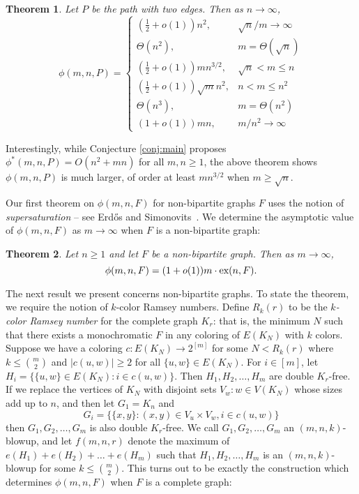 \documentclass[12pt]{article}
\newtheorem{theorem}{Theorem}
\newcommand*{\ex}{\textnormal{ex}}
\begin{document}
\begin{theorem}\label{thm:pm}
Let $P$ be the path with two edges. Then as $n \rightarrow \infty$,
\[
  \phi(m, n, P) = \begin{cases}
    \left(\frac{1}{2} + o(1)\right)n^2, & \sqrt{n}/m \to \infty \\
    \Theta(n^2), & m = \Theta(\sqrt{n}) \\
    \left(\frac{1}{2} + o(1)\right)mn^{3/2}, & \sqrt{n} < m \leq n \\
    \left(\frac{1}{2} + o(1)\right)\sqrt{m}n^{2}, & n < m \leq n^2 \\
    \Theta(n^3), & m = \Theta(n^2) \\
    \left(1 + o(1)\right)mn, & m/n^2 \to \infty
  \end{cases}
\]
\end{theorem}

Interestingly, while Conjecture \ref{conj:main} proposes $\phi^*(m,n,P) = O(n^2 + mn)$ for all $m,n \geq 1$, the above theorem shows $\phi(m,n,P)$ is much larger, of order at least $mn^{3/2}$ when $m \geq \sqrt{n}$.  

Our first theorem on $\phi(m,n,F)$ for non-bipartite graphs $F$ uses the notion of \textit{supersaturation} -- see Erd\H{o}s and Simonovits~\cite{ErdosSimonovits1983}. We determine the asymptotic value of $\phi(m,n,F)$ as $m \rightarrow \infty$ when $F$ is a non-bipartite graph:

\begin{theorem}\label{thm:asymp}
  Let $n \geq 1$ and let $F$ be a non-bipartite graph. Then as $m \rightarrow \infty$, 
  \[
    \phi(m, n, F) = (1 + o(1))m \cdot \ex(n, F).
  \]
\end{theorem}

The next result we present concerns non-bipartite graphs. To state the theorem, we require the notion of $k$-color Ramsey numbers. Define
$R_k(r)$ to be the \textit{$k$-color Ramsey number} for the complete graph $K_r$: that is, the minimum $N$ such that there exists a monochromatic $F$ in any coloring of $E(K_N)$ with $k$ colors. 
Suppose we have a coloring $c : E(K_N) \rightarrow 2^{[m]}$ for some $N < R_k(r)$ where $k \leq \binom{m}{2}$ and $|c(u,w)| \geq 2$ for all $\{u,w\} \in E(K_N)$. For $i \in [m]$, let $H_i = \{\{u,w\} \in E(K_N) : i \in c(u,w)\}$. Then $H_1,H_2,\dots,H_m$ are double $K_r$-free. If we replace the vertices of $K_N$ 
with disjoint sets $V_w : w \in V(K_N)$ whose sizes add up to $n$, and then let $G_1 = K_n$ and 
\[ G_i = \{\{x,y\} : (x,y) \in V_u \times V_w, i \in c(u,w)\} \]
then $G_1,G_2,\dots,G_m$ is also double $K_r$-free. We call $G_1,G_2,\dots,G_m$ an $(m,n,k)$-blowup, and 
let $f(m,n,r)$ denote the maximum of $e(H_1) + e(H_2) + \dots + e(H_m)$ such that $H_1,H_2,\dots,H_m$ is an $(m,n,k)$-blowup for some $k \leq \binom{m}{2}$. This turns out to be exactly the construction which determines $\phi(m,n,F)$ when $F$ is a complete graph: 
\end{document}

